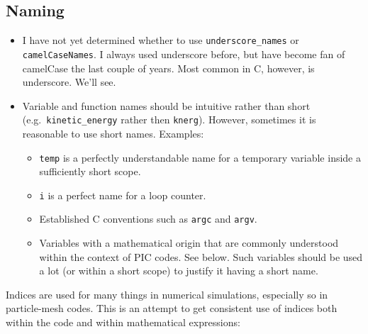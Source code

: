 \documentclass[10pt,a4paper]{article}
\begin{document}
\subsection{Naming}

\begin{itemize}
	\item I have not yet determined whether to use \lstinline$underscore_names$ or \lstinline$camelCaseNames$. I always used underscore before, but have become fan of camelCase the last couple of years. Most common in C, however, is underscore. We'll see.
	\item Variable and function names should be intuitive rather than short (e.g.\ \lstinline$kinetic_energy$ rather then \lstinline$knerg$). However, sometimes it is reasonable to use short names. Examples:
		\begin{itemize}
			\item \lstinline$temp$ is a perfectly understandable name for a temporary variable inside a sufficiently short scope.
			\item \lstinline$i$ is a perfect name for a loop counter.
			\item Established C conventions such as \lstinline$argc$ and \lstinline$argv$.
			\item Variables with a mathematical origin that are commonly understood within the context of PIC codes. See below. Such variables should be used a lot (or within a short scope) to justify it having a short name.
		\end{itemize}
\end{itemize}

Indices are used for many things in numerical simulations, especially so in particle-mesh codes. This is an attempt to get consistent use of indices both within the code and within mathematical expressions:
\end{document}
